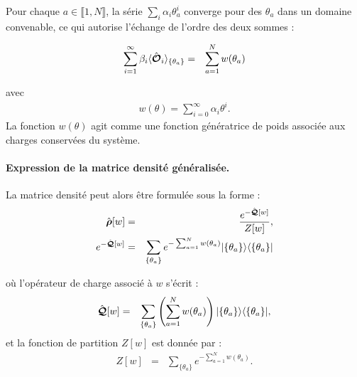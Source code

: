 Pour chaque $a \in \llbracket 1, N \rrbracket$, la série $\sum_i \alpha_i \theta_a^i$ converge pour des $\theta_a$ dans un domaine convenable, ce qui autorise l’échange de l’ordre des deux sommes : 
	
\begin{eqnarray}
	\sum_{i = 1}^\infty  \beta_i \langle \hat{\bm{\mathcal{O}}}_i \rangle_{ \{\theta_a \} } & = & \sum_{a = 1 }^N  w(\theta_a) 
\end{eqnarray}
	
avec 
\begin{eqnarray}
	w(\theta) = \sum_{i=0}^\infty \alpha_i \theta^i.	
\end{eqnarray}
La fonction $w(\theta)$ agit comme une fonction génératrice de poids associée aux charges conservées du système.

\paragraph{Expression de la matrice densité généralisée.}
La matrice densité peut alors être formulée sous la forme :	
\begin{eqnarray}
	\hat{\bm{\rho}}[w] & = & \frac{e^{-\hat{\bm{\mathcal{Q}}}[w]}}{Z[w]}, \\
	e^{-\hat{\bm{\mathcal{Q}}}[w]} & = & 	\sum_{\{\theta_a \}} e^{- \sum_{a = 1}^N w(\theta_a) } \vert \{ \theta_a\} \rangle \langle  \{ \theta_a\}  \vert 
\end{eqnarray}
 
	
où l'opérateur de charge associé à $w$ s’écrit :
\begin{eqnarray}
	\hat{\bm{\mathcal{Q}}} [w]   & = &  \sum_{\{\theta_a \}} \left ( \sum_{a = 1}^N w ( \theta_a )  \right ) \vert \{ \theta_a \} \rangle \langle \{ \theta_a \} \vert,	
\end{eqnarray}
et la fonction de partition $Z[w]$ est donnée par :
\begin{eqnarray}
	Z[w]  & = & \sum_{\{\theta_a \}} e^{-\sum_{a = 1}^N w(\theta_a)}.		
\end{eqnarray}


